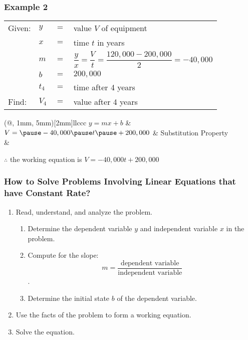 \documentclass[14pt]{beamer}
\begin{document}
\begin{frame}
	\frametitle{Example 2}
	
	\begin{tabular}{llll}
		Given: &  $ y $ & $ = $ & value $ V $ of equipment \\
		&  $ x $ & $ = $ & time $ t $ in years \\
		&  $ m $ & $ = $ &\footnotesize $ \dfrac{y}{x}  = \dfrac{V}{t} =  \dfrac{120,000 - 200,000}{2}  = -40,000$ \\
		&  $ b $ & $ = $ & $ 200,000 $ \\
		& $ t_4 $ & $ = $ & time after 4 years \\
		 Find: &  $ V_4$ & $ = $ & value after 4 years \\
	\end{tabular}
	
	\vhalf
	\begin{TAB}(@, 1mm, 5mm)[2mm]{ll}{ccc}
		\pause  $ y = mx + b $ &  \\
		
		\pause $ V = \pause -40,000 \pause t \pause + 200,000 $  & \pause Substitution Property \\
		&\\
	\end{TAB}
	
	\pause $ \therefore $ the working equation is $ V = -40,000 t + 200,000 $ 
\end{frame}

\begin{frame}
	\frametitle{How to Solve Problems Involving Linear Equations that have Constant Rate?}
	\footnotesize
	\begin{enumerate}  
		\item Read, understand, and analyze the problem. 
		\begin{enumerate}
			\footnotesize
			\item  Determine the dependent variable $ y $ and independent variable $ x $ in the problem.
			\item  Compute for the slope:  \[ m = \dfrac{\text{dependent variable}}{\text{independent variable}} \] .
			\item  Determine the initial state $ b $ of the dependent variable.
		\end{enumerate}
		\item  Use the facts of the problem to form a working equation.
		\item  Solve the equation.			
	\end{enumerate}  
\end{frame}
\end{document}
